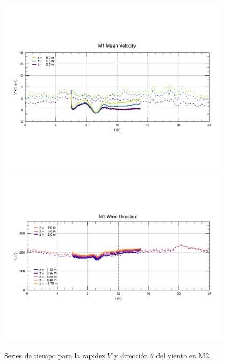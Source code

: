 \begin{figure}[H]
	\centering
	\includegraphics[width=0.87\linewidth,page=2,trim={9mm 57mm 10mm 60mm},clip]{Imagenes/06/bol/ts_interpol_compare.pdf}\\%
	\includegraphics[width=0.87\linewidth,page=2,trim={12mm 52mm 10mm 60mm},clip]{Imagenes/06/bol/ts_interpol_compare_o.pdf}%
	\vspace{-2mm}\caption{Series de tiempo para la rapidez $V$ y dirección $\theta$ del viento en M2.}
	\label{fig:06_bol_ts_m2}
\end{figure}

